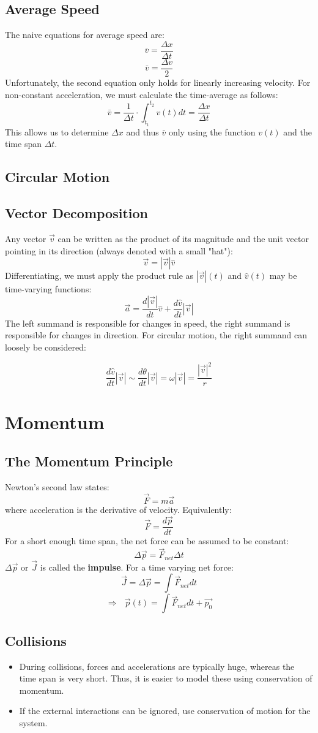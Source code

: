 \documentclass{article}
\begin{document}
\subsection{Average Speed}
The naive equations for average speed are:
$$\bar{v}=\frac{\Delta x}{\Delta t}$$
$$\bar{v}=\frac{\Delta v}{2}$$
Unfortunately, the second equation only holds for linearly increasing velocity. For non-constant acceleration, we must calculate the time-average as follows:
$$\bar{v}=\frac{1}{\Delta t}\cdot \int_{t_1}^{t_2}v(t)dt=\frac{\Delta x}{\Delta t}$$
This allows us to determine $\Delta x$ and thus $\bar{v}$ only using the function $v(t)$ and the time span $\Delta t$.
\subsection{Circular Motion}
\subsection{Vector Decomposition}
Any vector $\vec{v}$ can be written as the product of its magnitude and the unit vector pointing in its direction (always denoted with a small "hat"):
$$\vec{v}=|\vec{v}|\hat{v}$$
Differentiating, we must apply the product rule as $|\vec{v}|(t)$ and $\hat{v}(t)$ may be time-varying functions:
$$\vec{a}=\frac{d|\vec{v}|}{dt}\hat{v}+\frac{d\hat{v}}{dt}|\vec{v}|$$
The left summand is responsible for changes in speed, the right summand is responsible for changes in direction. For circular motion, the right summand can loosely be considered:

$$\frac{d\hat{v}}{dt}|\vec{v}| \sim \frac{d\theta}{dt}|\vec{v}|=\omega |\vec{v}|=\frac{|\vec{v}|^2}{r} $$
\pagebreak
\section{Momentum}
\subsection{The Momentum Principle}
Newton's second law states:
$$\vec{F}=m\vec{a}$$
where acceleration is the derivative of velocity. Equivalently:
$$\vec{F}=\frac{d\vec{p}}{dt}$$
For a short enough time span, the net force can be assumed to be constant:
$$\Delta \vec{p}=\vec{F}_{net}\Delta t$$
$\Delta \vec{p}$ or $\vec{J}$ is called the \textbf{impulse}. For a time varying net force:
$$\vec{J}=\Delta\vec{p}=\int \vec{F}_{net} dt$$
$$\Rightarrow \text{  }\vec{p}(t)=\int \vec{F}_{net}dt + \vec{p_0}$$
\subsection{Collisions}
\begin{itemize}
    \item During collisions, forces and accelerations are typically huge, whereas the time span is very short. Thus, it is easier to model these using conservation of momentum.
    \item If the external interactions can be ignored, use conservation of motion for the system.
\end{itemize}
\end{document}

